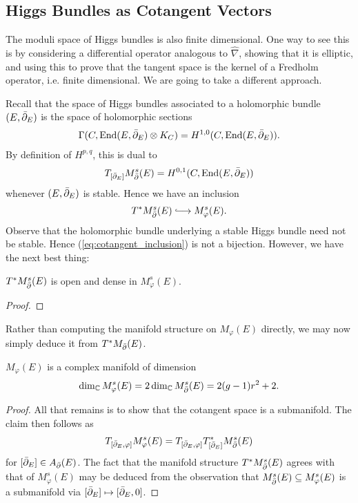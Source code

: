 \documentclass[12pt]{ociamthesis}  %
\begin{document}
\subsection{Higgs Bundles as Cotangent Vectors}

The moduli space of Higgs bundles is also finite dimensional. One way to
see this is by considering a differential operator analogous to $\hat\nabla$,
showing that it is elliptic, and using this to prove that the
tangent space is the kernel of a Fredholm operator, i.e. finite
dimensional. We are going to take a different approach.

Recall that the space of Higgs bundles associated to a holomorphic
bundle $(E,{\bar{\partial}}_E)$ is the space of holomorphic sections
\begin{align*}
  \Gamma(C,\operatorname{End}(E,{\bar{\partial}}_E) \otimes K_C) = H^{1,0}(C,\operatorname{End}(E,{\bar{\partial}}_E)).
\end{align*}
By definition of $H^{p,q}$, this is dual to
\begin{align*}
  T_{[{\bar{\partial}}_E]}M^s_{\bar{\partial}}(E) = H^{0,1}(C,\operatorname{End}(E,{\bar{\partial}}_E))
\end{align*}
whenever $(E,{\bar{\partial}}_E)$ is stable. Hence we have an inclusion
\begin{align}\label{eq:cotangent_inclusion}
  T^*M^s_\dol(E) \longinc M^s_\varphi(E).
\end{align}
Observe that the holomorphic bundle underlying a stable Higgs bundle need
not be stable. Hence (\ref{eq:cotangent_inclusion}) is not a bijection.
However, we have the next best thing:

\begin{theorem}\label{thm:stables_are_dense}
  $T^*M^s_{\bar{\partial}}(E)$ is open and dense in $M^s_\varphi(E)$.
  \begin{proof}
    \missingproof
  \end{proof}
\end{theorem}

Rather than computing the manifold structure on $M_\varphi(E)$
directly, we may now simply deduce it from $T^*M_{\bar{\partial}}(E)$.

\begin{corollary}
  $M_\varphi(E)$ is a complex manifold of dimension
  \begin{align*}
    \dim_{\mathbb C}M^s_{\varphi}(E)
    =2\dim_{\mathbb C}M^s_{\bar{\partial}}(E)
    =2(g-1)r^2 + 2.
  \end{align*}
  \begin{proof}
    All that remains is to show that the cotangent space is a submanifold.
    The claim then follows as
    \begin{align*}
      T_{[{\bar{\partial}}_E,\varphi]}M^s_\varphi(E) = T_{[{\bar{\partial}}_E,\varphi]} T^*_{[{\bar{\partial}}_E]}M^s_{\bar{\partial}}(E)
    \end{align*}
    for $[{\bar{\partial}}_E]\in A_{\bar{\partial}}(E)$. The fact that the manifold
    structure $T^*M^s_{\bar{\partial}}(E)$ agrees with that of $M^s_{\varphi}(E)$
    may be deduced from the observation that
    $M^s_{\bar{\partial}}(E) \subseteq M^s_\varphi(E)$ is a submanifold
    via $[{\bar{\partial}}_E] \mapsto [{\bar{\partial}}_E,0]$.
  \end{proof}
\end{corollary}
\end{document}
